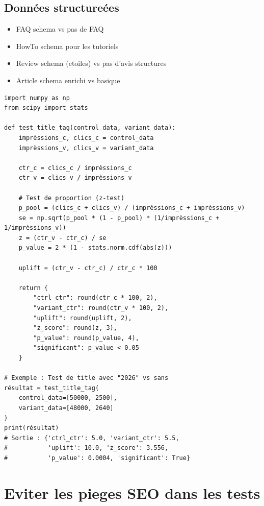 \documentclass[12pt,a4paper,twoside]{report}
\begin{document}
\subsection{Données structureées}

\begin{itemize}
    \item FAQ schema vs pas de FAQ
    \item HowTo schema pour les tutoriels
    \item Review schema (etoiles) vs pas d'avis structures
    \item Article schema enrichi vs basique
\end{itemize}

\begin{lstlisting}[style=code,caption={Exemple de test A/B sur les title tags (Python)}]
import numpy as np
from scipy import stats

def test_title_tag(control_data, variant_data):
    imprèssions_c, clics_c = control_data
    imprèssions_v, clics_v = variant_data

    ctr_c = clics_c / imprèssions_c
    ctr_v = clics_v / imprèssions_v

    # Test de proportion (z-test)
    p_pool = (clics_c + clics_v) / (imprèssions_c + imprèssions_v)
    se = np.sqrt(p_pool * (1 - p_pool) * (1/imprèssions_c + 1/imprèssions_v))
    z = (ctr_v - ctr_c) / se
    p_value = 2 * (1 - stats.norm.cdf(abs(z)))

    uplift = (ctr_v - ctr_c) / ctr_c * 100

    return {
        "ctrl_ctr": round(ctr_c * 100, 2),
        "variant_ctr": round(ctr_v * 100, 2),
        "uplift": round(uplift, 2),
        "z_score": round(z, 3),
        "p_value": round(p_value, 4),
        "significant": p_value < 0.05
    }

# Exemple : Test de title avec "2026" vs sans
résultat = test_title_tag(
    control_data=[50000, 2500],
    variant_data=[48000, 2640]
)
print(résultat)
# Sortie : {'ctrl_ctr': 5.0, 'variant_ctr': 5.5,
#           'uplift': 10.0, 'z_score': 3.556,
#           'p_value': 0.0004, 'significant': True}
\end{lstlisting}

\section{Eviter les pieges SEO dans les tests}
\end{document}
